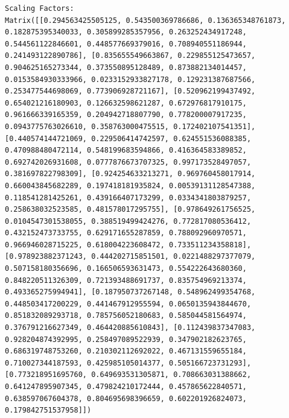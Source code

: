 \documentclass[
  letterpaper,
  DIV=11,
  numbers=noendperiod]{scrreprt}
\theoremstyle{plain}
\theoremstyle{definition}
\theoremstyle{remark}
\begin{document}
\begin{verbatim}
Scaling Factors:
Matrix([[0.294563425505125, 0.543500369786686, 0.136365348761873, 0.182875395340033, 0.305899285357956, 0.263252434917248, 0.544561122846601, 0.448577669379016, 0.708940551186944, 0.241493122890786], [0.835655549663867, 0.229855125473657, 0.904625165273344, 0.373550895128489, 0.873882134014457, 0.0153584930333966, 0.0233152933827178, 0.129231387687566, 0.253477544698069, 0.773906928721167], [0.520962199437492, 0.654021216180903, 0.126632598621287, 0.672976817910175, 0.961666339165359, 0.204942718807790, 0.778200007917235, 0.0943775763026610, 0.358763000475515, 0.172402107541351], [0.440574144721069, 0.229506414742597, 0.624551536088385, 0.470988480472114, 0.548199683594866, 0.416364583389852, 0.692742026931608, 0.0777876673707325, 0.997173528497057, 0.381697822798309], [0.924254633213271, 0.969760458017914, 0.660043845682289, 0.197418181935824, 0.00539131128547388, 0.118541281425261, 0.439166407173299, 0.0334341803879257, 0.258638032523585, 0.481578017295755], [0.978649261756525, 0.0104547301538055, 0.388519499424276, 0.772817080536412, 0.432152473733755, 0.629171655287859, 0.788092960970571, 0.966946028715225, 0.618004223608472, 0.733511234358818], [0.978923882371243, 0.444202715851501, 0.0221488297377079, 0.507158180356696, 0.166506593631473, 0.554222643680360, 0.848220511326309, 0.721393488691737, 0.835754969213374, 0.493365275994941], [0.187950737267148, 0.548962499354768, 0.448503417200229, 0.441467912955594, 0.0650135943844670, 0.851832089293718, 0.785756052180683, 0.585044581564974, 0.376791216627349, 0.464420885610843], [0.112439837347083, 0.928204874392995, 0.258497089522939, 0.347902182623765, 0.686319748753260, 0.210302112692022, 0.467131559655184, 0.710027344187593, 0.425985105014377, 0.505166723731293], [0.773218951695760, 0.649693531305871, 0.708663031388662, 0.641247895907345, 0.479824210172444, 0.457865622840571, 0.638597067604378, 0.804695698396659, 0.602201926824073, 0.179842751537958]])


\end{verbatim}
\end{document}
